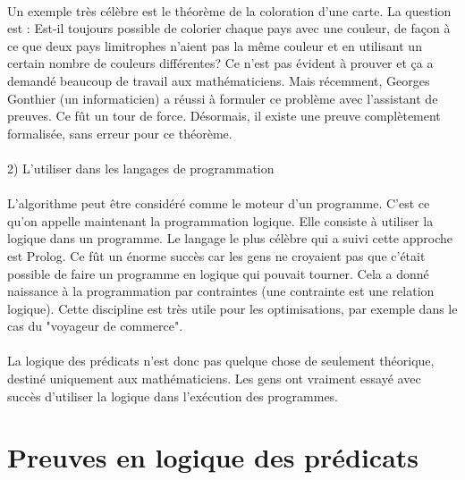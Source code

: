 \paragraph{}
    
    Un exemple très célèbre est le théorème de la coloration d'une carte. La question est : Est-il toujours possible de colorier chaque pays avec une couleur, de façon à ce que deux pays limitrophes n'aient pas la même couleur et en utilisant un certain nombre de couleurs différentes? Ce n'est pas évident à prouver et ça a demandé beaucoup de travail aux mathématiciens. Mais récemment, Georges Gonthier (un informaticien) a réussi à formuler ce problème avec l'assistant de preuves. Ce fût un tour de force. Désormais, il existe une preuve complètement formalisée, sans erreur pour ce théorème.

\paragraph{}
2) L'utiliser dans les langages de programmation
\paragraph{}

    L'algorithme peut être considéré comme le moteur d'un programme. C'est ce qu'on appelle maintenant la programmation logique. Elle consiste à utiliser la logique dans un programme. Le langage le plus célèbre qui a suivi cette approche est Prolog. Ce fût un énorme succès car les gens ne croyaient pas que c'était possible de faire un programme en logique qui pouvait tourner. Cela a donné naissance à la programmation par contraintes (une contrainte est une relation logique). Cette discipline est très utile pour les optimisations, par exemple dans le cas du "voyageur de commerce".

\paragraph{}
La logique des prédicats n'est donc pas quelque chose de seulement théorique, destiné uniquement aux mathématiciens. Les gens ont vraiment essayé avec succès d'utiliser la logique dans l'exécution des programmes.
\paragraph{}

\section{Preuves en logique des prédicats}

